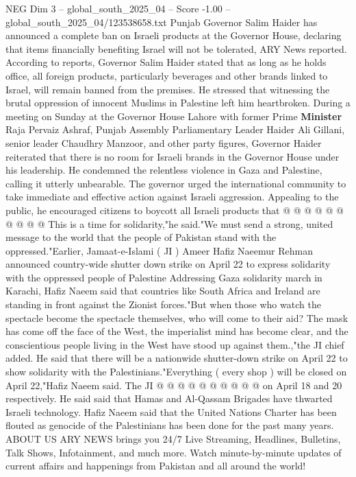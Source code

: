 \begin{textsample}{NEG Dim 3 – global\_south\_2025\_04 – Score -1.00 – global\_south\_2025\_04/123538658.txt}  \label{ex:f3_neg_347}
Punjab Governor Salim Haider has announced a complete ban on Israeli products at the Governor House, declaring that items financially benefiting Israel will not be tolerated, ARY News reported.
According to reports, Governor Salim Haider stated that as long as he holds office, all foreign products, particularly beverages and other brands linked to Israel, will remain banned from the premises.
He stressed that witnessing the brutal oppression of innocent Muslims in Palestine left him heartbroken.
During a meeting on Sunday at the Governor House Lahore with former Prime \textbf{Minister} Raja Pervaiz Ashraf, Punjab Assembly Parliamentary Leader Haider Ali Gillani, senior leader Chaudhry Manzoor, and other party figures, Governor Haider reiterated that there is no room for Israeli brands in the Governor House under his leadership.
He condemned the relentless violence in Gaza and Palestine, calling it utterly unbearable.
The governor urged the international community to take immediate and effective action against Israeli aggression.
Appealing to the public, he encouraged citizens to boycott all Israeli products that @ @ @ @ @ @ @ @ @ @ This is a time for solidarity,"he said."We must send a strong, united message to the world that the people of Pakistan stand with the oppressed."Earlier, Jamaat-e-Islami ( JI ) Ameer Hafiz Naeemur Rehman announced country-wide shutter down strike on April 22 to express solidarity with the oppressed people of Palestine Addressing Gaza solidarity march in Karachi, Hafiz Naeem said that countries like South Africa and Ireland are standing in front against the Zionist forces."But when those who watch the spectacle become the spectacle themselves, who will come to their aid?
The mask has come off the face of the West, the imperialist mind has become clear, and the conscientious people living in the West have stood up against them.,"the JI chief added.
He said that there will be a nationwide shutter-down strike on April 22 to show solidarity with the Palestinians."Everything ( every shop ) will be closed on April 22,"Hafiz Naeem said.
The JI @ @ @ @ @ @ @ @ @ @ on April 18 and 20 respectively.
He said said that Hamas and Al-Qassam Brigades have thwarted Israeli technology.
Hafiz Naeem said that the United Nations Charter has been flouted as genocide of the Palestinians has been done for the past many years.
ABOUT US ARY NEWS brings you 24/7 Live Streaming, Headlines, Bulletins, Talk Shows, Infotainment, and much more.
Watch minute-by-minute updates of current affairs and happenings from Pakistan and all around the world!

\end{textsample}
